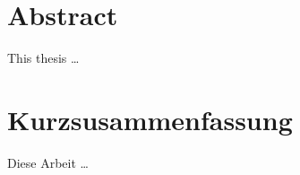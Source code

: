 \chapter*{Abstract}
\thispagestyle{empty}
This thesis \dots
{}
\chapter*{Kurzsusammenfassung}
\thispagestyle{empty}
Diese Arbeit \dots
\pagebreak